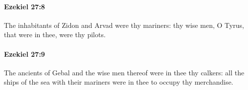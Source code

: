 		\paragraph{Ezekiel 27:8} %
			\label{EZEKIEL-27-8}

			The inhabitants of Zidon and Arvad were thy mariners: thy wise men, O Tyrus, that were in thee, were thy pilots.


		\paragraph{Ezekiel 27:9} %
			\label{EZEKIEL-27-9}

			The ancients of Gebal and the wise men thereof were in thee thy calkers: all the ships of the sea with their mariners were in thee to occupy thy merchandise.


